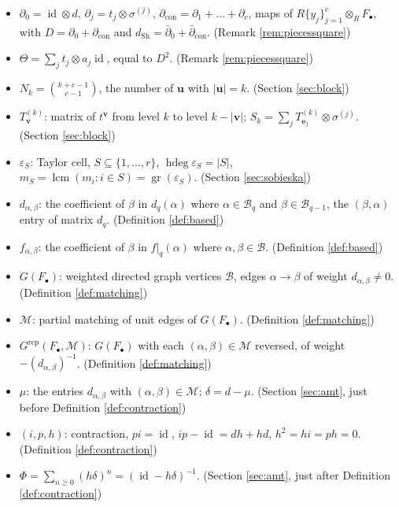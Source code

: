 \documentclass[12pt]{amsart}
\theoremstyle{plain}
\theoremstyle{definition}
\newcommand{\dcon}{\partial_{\mathrm{con}}}
\newcommand{\F}{ {F_\bullet} }
\newcommand{\M}{\mathcal{M}}
\newcommand{\B}{\mathcal{B}}
\newcommand{\Grep}{G^{\mathrm{rep}}}
\newcommand{\id}{\operatorname{id}}
\newcommand{\lcm}{\operatorname{lcm}}
\newcommand{\hdeg}{\operatorname{hdeg}}
\newcommand{\gr}{\operatorname{gr}}
\newcommand{\Sh}{\mathrm{Sh}}
\newcommand{\eps}{\varepsilon}
\newcommand{\cbl}{\color{blue}}
\begin{document}
\begin{itemize}[leftmargin=*,itemsep=0pt,parsep=0pt]
    \item $\partial_0 = \id \otimes d$, $\partial_j = t_j \otimes \sigma^{(j)}$, $\dcon = \partial_1 + \dots + \partial_c$, maps of $R\{y_j\}_{j=1}^{c} \otimes_R \F$, with $D = \partial_0 + \dcon$ and $d_{\Sh} = \bar\partial_0 + \bar\partial_{\mathrm{con}}$. {\cbl (Remark \ref{rem:piecessquare})}
    \item $\Theta = \sum_j t_j \otimes a_j \id$, equal to $D^2$. {\cbl (Remark \ref{rem:piecessquare})}
    \item $N_k = \binom{k+c-1}{c-1}$, the number of $\boldsymbol{u}$ with $|\boldsymbol{u}| = k$. {\cbl (Section \ref{sec:block})}
    \item $T^{(k)}_{\boldsymbol{v}}$: matrix of $t^{\boldsymbol{v}}$ from level $k$ to level $k - |\boldsymbol{v}|$; $S_k = \sum_j T^{(k)}_{\boldsymbol{e}_j} \otimes \sigma^{(j)}$. {\cbl (Section \ref{sec:block})}
    \item $\eps_S$: Taylor cell, $S \subseteq \{1, \dots, r\}$, $\hdeg \eps_S = |S|$, $m_S = \lcm(m_i : i \in S) = \gr(\eps_S)$. {\cbl (Section \ref{sec:sobieska})}
    \item $d_{\alpha,\beta}$: the coefficient of $\beta$ in $d_q (\alpha)$ where $\alpha \in \B_q$ and $\beta \in \B_{q-1}$, the $(\beta,\alpha)$ entry of matrix $d_q$. {\cbl (Definition \ref{def:based})}
    \item $f_{\alpha,\beta}$: the coefficient of $\beta$ in $f|_q(\alpha)$ where $\alpha , \beta \in \B$. {\cbl (Definition \ref{def:based})}
    \item $G(\F)$: weighted directed graph vertices $\B$, edges $\alpha \to \beta$ of weight $d_{\alpha,\beta} \neq 0$. {\cbl (Definition \ref{def:matching})}
    \item $\M$: partial matching of unit edges of $G(\F)$. {\cbl (Definition \ref{def:matching})}
    \item $\Grep(\F, \M)$: $G(\F)$ with each $(\alpha, \beta) \in \M$ reversed, of weight $-(d_{\alpha,\beta})^{-1}$. {\cbl (Definition \ref{def:matching})}
    \item $\mu$: the entries $d_{\alpha,\beta}$ with $(\alpha, \beta) \in \M$; $\delta = d - \mu$. {\cbl (Section \ref{sec:amt}, just before Definition \ref{def:contraction})}
    \item $(i, p, h)$: contraction, $pi = \id$, $ip - \id = dh + hd$, $h^2 = hi = ph = 0$. {\cbl (Definition \ref{def:contraction})}
    \item $\Phi = \sum_{n \ge 0} (h\delta)^n = (\id - h\delta)^{-1}$. {\cbl (Section \ref{sec:amt}, just after Definition \ref{def:contraction})}

\end{itemize}
\end{document}
